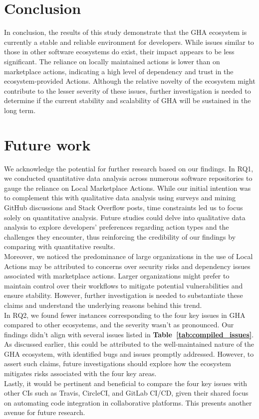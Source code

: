 \documentclass[conference]{IEEEtran}
\begin{document}
\section{Conclusion}
	In conclusion, the results of this study demonstrate that the GHA ecosystem is currently a stable and reliable environment for developers. While issues similar to those in other software ecosystems do exist, their impact appears to be less significant. The reliance on locally maintained actions is lower than on marketplace actions, indicating a high level of dependency and trust in the ecosystem-provided Actions. Although the relative novelty of the ecosystem might contribute to the lesser severity of these issues, further investigation is needed to determine if the current stability and scalability of GHA will be sustained in the long term.

\section{Future work}
	We acknowledge the potential for further research based on our findings. In RQ1, we conducted quantitative data analysis across numerous software repositories to gauge the reliance on Local Marketplace Actions. While our initial intention was to complement this with qualitative data analysis using surveys and mining GitHub discussions and Stack Overflow posts, time constraints led us to focus solely on quantitative analysis. Future studies could delve into qualitative data analysis to explore developers' preferences regarding action types and the challenges they encounter, thus reinforcing the credibility of our findings by comparing with quantitative results.\\
	Moreover, we noticed the predominance of large organizations in the use of Local Actions may be attributed to concerns over security risks and dependency issues associated with marketplace actions. Larger organizations might prefer to maintain control over their workflows to mitigate potential vulnerabilities and ensure stability. However, further investigation is needed to substantiate these claims and understand the underlying reasons behind this trend.\\	
	In RQ2, we found fewer instances corresponding to the four key issues in GHA compared to other ecosystems, and the severity wasn't as pronounced. Our findings didn't align with several issues listed in \textbf{Table~\ref{tab:compiled_issues}}. As discussed earlier, this could be attributed to the well-maintained nature of the GHA ecosystem, with identified bugs and issues promptly addressed. However, to assert such claims, future investigations should explore how the ecosystem mitigates risks associated with the four key areas.\\
	Lastly, it would be pertinent and beneficial to compare the four key issues with other CIs such as Travis, CircleCI, and GitLab CI/CD, given their shared focus on automating code integration in collaborative platforms. This presents another avenue for future research.
\end{document}
